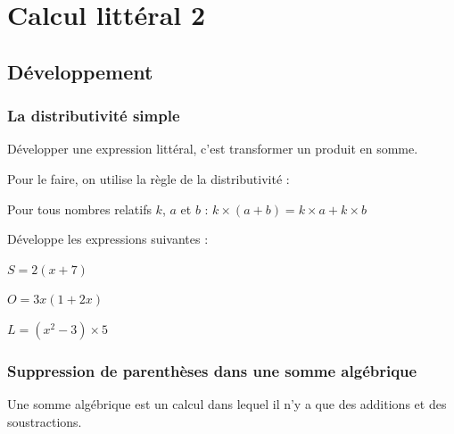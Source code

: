 \documentclass[a4paper,10pt]{report}
\begin{document}
\newpage
\setcounter{chapter}{10}
\chapter{Calcul littéral 2}

\section{Développement}

\vspace{-2mm}
\subsection{La distributivité simple}

\vspace{-2mm}
\begin{prop}
Développer une expression littéral, c'est transformer un produit en somme. 

\noindent Pour le faire, on utilise la règle de la distributivité : 

\medskip
\noindent Pour tous nombres relatifs $k$, $a$ et $b$ : \hspace{2cm} $k \times (a+b) = k \times a+k \times b $
\end{prop}

\vspace{-2mm}
\begin{ex}
Développe les expressions suivantes : 

\hspace{0.5cm}\begin{minipage}{6cm}
$S=2(x+7)$
\end{minipage}
\begin{minipage}{6cm}
$O=3x(1+2x)$
\end{minipage}
\begin{minipage}{6cm}
$L=(x^2-3)\times 5$
\end{minipage}

\noindent\grandscarreaux{\linewidth}{1.6cm}
\end{ex}

\vspace{-2mm}
\subsection{Suppression de parenthèses dans une somme algébrique}

\vspace{-2mm}
\begin{defn}
Une somme algébrique est un calcul dans lequel il n'y a que des additions et des soustractions.
\end{defn}
\end{document}
